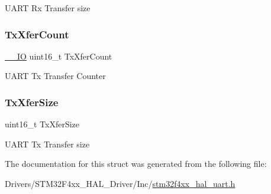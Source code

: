 U\+A\+RT Rx Transfer size \mbox{\label{struct_u_a_r_t___handle_type_def_a1823437fbed80bdd1510782ced4e5532}} 
\subsubsection{\texorpdfstring{Tx\+Xfer\+Count}{TxXferCount}}
{\footnotesize\ttfamily \mbox{\hyperlink{core__sc300_8h_aec43007d9998a0a0e01faede4133d6be}{\+\_\+\+\_\+\+IO}} uint16\+\_\+t Tx\+Xfer\+Count}

U\+A\+RT Tx Transfer Counter \mbox{\label{struct_u_a_r_t___handle_type_def_a80907b65d6f9541bc0dee444d16bc45b}} 
\subsubsection{\texorpdfstring{Tx\+Xfer\+Size}{TxXferSize}}
{\footnotesize\ttfamily uint16\+\_\+t Tx\+Xfer\+Size}

U\+A\+RT Tx Transfer size 

The documentation for this struct was generated from the following file\+:\begin{DoxyCompactItemize}
\item 
Drivers/\+S\+T\+M32\+F4xx\+\_\+\+H\+A\+L\+\_\+\+Driver/\+Inc/\mbox{\hyperlink{stm32f4xx__hal__uart_8h}{stm32f4xx\+\_\+hal\+\_\+uart.\+h}}\end{DoxyCompactItemize}
